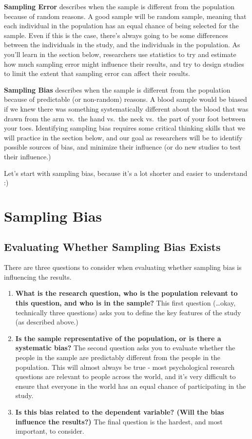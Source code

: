 \documentclass[
  letterpaper,
  DIV=11,
  numbers=noendperiod,
  oneside]{scrreprt}
\providecommand{\tightlist}{%
  \setlength{\itemsep}{0pt}\setlength{\parskip}{0pt}}\usepackage{longtable,booktabs,array}
\begin{document}
\textbf{Sampling Error} describes when the sample is different from the
population because of random reasons. A good sample will be random
sample, meaning that each individual in the population has an equal
chance of being selected for the sample. Even if this is the case,
there's always going to be some differences between the individuals in
the study, and the individuals in the population. As you'll learn in the
section below, researchers use statistics to try and estimate how much
sampling error might influence their results, and try to design studies
to limit the extent that sampling error can affect their results.

\textbf{Sampling Bias} describes when the sample is different from the
population because of predictable (or non-random) reasons. A blood
sample would be biased if we knew there was something systematically
different about the blood that was drawn from the arm vs.~the hand
vs.~the neck vs.~the part of your foot between your toes. Identifying
sampling bias requires some critical thinking skills that we will
practice in the section below, and our goal as researchers will be to
identify possible sources of bias, and minimize their influence (or do
new studies to test their influence.)

Let's start with sampling bias, because it's a lot shorter and easier to
understand :)

\section{Sampling Bias}\label{sampling-bias}

\subsection{Evaluating Whether Sampling Bias
Exists}\label{evaluating-whether-sampling-bias-exists}

There are three questions to consider when evaluating whether sampling
bias is influencing the results.

\begin{enumerate}
\def\labelenumi{\arabic{enumi}.}
\tightlist
\item
  \textbf{What is the research question, who is the population relevant
  to this question, and who is in the sample?} This first question
  (\ldots okay, technically three questions) asks you to define the key
  features of the study (as described above.)
\item
  \textbf{Is the sample representative of the population, or is there a
  systematic bias?} The second question asks you to evaluate whether the
  people in the sample are predictably different from the people in the
  population. This will almost always be true - most psychological
  research questions are relevant to people across the world, and it's
  very difficult to ensure that everyone in the world has an equal
  chance of participating in the study.
\item
  \textbf{Is this bias related to the dependent variable? (Will the bias
  influence the results?)} The final question is the hardest, and most
  important, to consider.
\end{enumerate}
\end{document}
